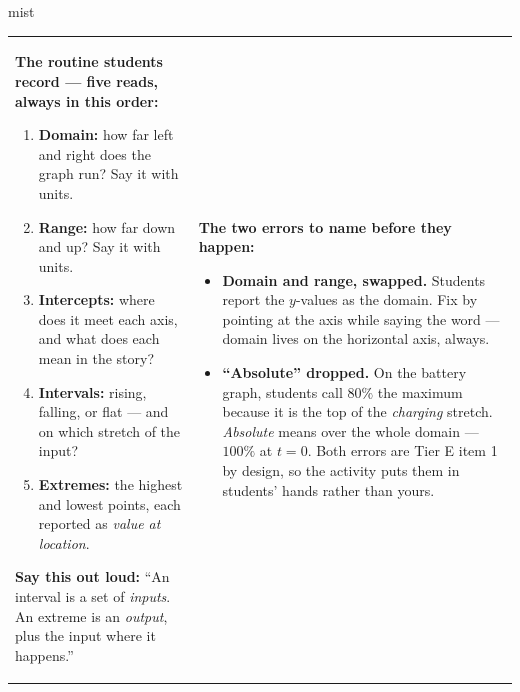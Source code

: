 \documentclass[10pt]{article}
\begin{document}
\boxguard
\begin{skillbox}{mist}
\begin{tabularx}{\linewidth}{@{}X|X@{}}
\begin{minipage}[t]{\linewidth}\vspace{0pt}
\textbf{The routine students record --- five reads, always in this order:}
\begin{enumerate}[leftmargin=1.4em, itemsep=2pt, topsep=2pt]
  \item \textbf{Domain:} how far left and right does the graph run? Say it with units.
  \item \textbf{Range:} how far down and up? Say it with units.
  \item \textbf{Intercepts:} where does it meet each axis, and what does each mean in the story?
  \item \textbf{Intervals:} rising, falling, or flat --- and on which stretch of the input?
  \item \textbf{Extremes:} the highest and lowest points, each reported as \emph{value at
        location}.
\end{enumerate}
\textbf{Say this out loud:} ``An interval is a set of \emph{inputs}. An extreme is an
\emph{output}, plus the input where it happens.''
\end{minipage}
&
\begin{minipage}[t]{\linewidth}\vspace{0pt}
\textbf{The two errors to name before they happen:}
\begin{itemize}[leftmargin=1.1em, itemsep=2pt, topsep=2pt]
  \item \textbf{Domain and range, swapped.} Students report the $y$-values as the domain. Fix by
        pointing at the axis while saying the word --- domain lives on the horizontal axis, always.
  \item \textbf{``Absolute'' dropped.} On the battery graph, students call $80\%$ the maximum
        because it is the top of the \emph{charging} stretch. \emph{Absolute} means over the whole
        domain --- $100\%$ at $t=0$. Both errors are Tier E item 1 by design, so the activity puts
        them in students' hands rather than yours.
\end{itemize}
\end{minipage}
\end{tabularx}
\end{skillbox}
\end{document}
